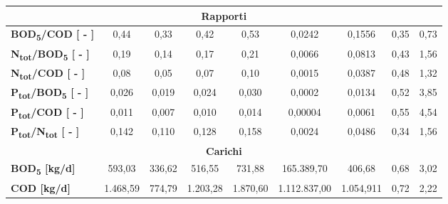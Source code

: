 \begin{sidewaystable}[h]
\begin{center}
\begin{tabular}{l|c|c|c|c|c|c|c|c|}
		\multicolumn{9}{|c|}{\textbf{Rapporti}}                                                                                                                                                                    \\ \hline
		\multicolumn{1}{|l|}{\textbf{BOD\textsubscript{5}/COD {[} - {]}}}       & 0,44           & 0,33                    & 0,42             & 0,53                    & 0,0242       & 0,1556     & 0,35        & 0,73           \\ \hline
		\multicolumn{1}{|l|}{\textbf{N\textsubscript{tot}/BOD\textsubscript{5} {[} - {]}}}      & 0,19           & 0,14                    & 0,17             & 0,21                    & 0,0066       & 0,0813     & 0,43        & 1,56           \\ \hline
		\multicolumn{1}{|l|}{\textbf{N\textsubscript{tot}/COD {[} - {]}}}       & 0,08           & 0,05                    & 0,07             & 0,10                    & 0,0015       & 0,0387     & 0,48        & 1,32           \\ \hline
		\multicolumn{1}{|l|}{\textbf{P\textsubscript{tot}/BOD\textsubscript{5} {[} - {]}}}      & 0,026          & 0,019                   & 0,024            & 0,030                   & 0,0002       & 0,0134     & 0,52        & 3,85           \\ \hline
		\multicolumn{1}{|l|}{\textbf{P\textsubscript{tot}/COD {[} - {]}}}       & 0,011          & 0,007                   & 0,010            & 0,014                   & 0,00004      & 0,0061     & 0,55        & 4,54           \\ \hline
		\multicolumn{1}{|l|}{\textbf{P\textsubscript{tot}/N\textsubscript{tot} {[} - {]}}}      & 0,142          & 0,110                   & 0,128            & 0,158                   & 0,0024       & 0,0486     & 0,34        & 1,56           \\ \hline
		\multicolumn{9}{|c|}{\textbf{Carichi}}                                                                                                                                                                     \\ \hline
		\multicolumn{1}{|l|}{\textbf{BOD\textsubscript{5} {[}kg/d{]}}}          & 593,03         & 336,62                  & 516,55           & 731,88                  & 165.389,70   & 406,68     & 0,68        & 3,02           \\ \hline
		\multicolumn{1}{|l|}{\textbf{COD {[}kg/d{]}}}           & 1.468,59       & 774,79                  & 1.203,28         & 1.870,60                & 1.112.837,00 & 1.054,911  & 0,72        & 2,22           \\ \hline

\end{tabular}
\end{center}
\end{sidewaystable}
